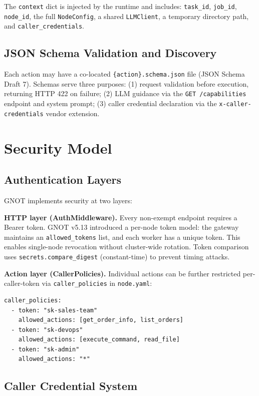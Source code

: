 \documentclass[10pt,twocolumn]{article}
\begin{document}
The \texttt{context} dict is injected by the runtime and includes:
\texttt{task\_id}, \texttt{job\_id}, \texttt{node\_id}, the full
\texttt{NodeConfig}, a shared \texttt{LLMClient}, a temporary directory
path, and \texttt{caller\_credentials}.

\subsection{JSON Schema Validation and Discovery}

Each action may have a co-located \texttt{\{action\}.schema.json} file
(JSON Schema Draft 7). Schemas serve three purposes: (1) request
validation before execution, returning HTTP 422 on failure; (2) LLM
guidance via the \texttt{GET /capabilities} endpoint and system prompt;
(3) caller credential declaration via the \texttt{x-caller-credentials}
vendor extension.

\FloatBarrier
\section{Security Model}
\label{sec:security}

\subsection{Authentication Layers}

GNOT implements security at two layers:

\textbf{HTTP layer (AuthMiddleware).} Every non-exempt endpoint requires
a Bearer token. GNOT v5.13 introduced a per-node token model: the
gateway maintains an \texttt{allowed\_tokens} list, and each worker has
a unique token. This enables single-node revocation without
cluster-wide rotation. Token comparison uses \texttt{secrets.compare\_digest}
(constant-time) to prevent timing attacks.

\textbf{Action layer (CallerPolicies).} Individual actions can be
further restricted per-caller-token via \texttt{caller\_policies} in
\texttt{node.yaml}:

\begin{lstlisting}[caption={Action-level authorization example}]
caller_policies:
  - token: "sk-sales-team"
    allowed_actions: [get_order_info, list_orders]
  - token: "sk-devops"
    allowed_actions: [execute_command, read_file]
  - token: "sk-admin"
    allowed_actions: "*"
\end{lstlisting}

\subsection{Caller Credential System}
\end{document}
